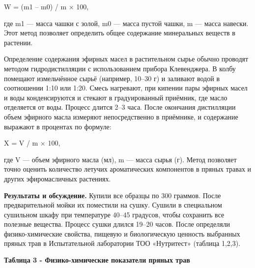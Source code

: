 \begin{multicols}{2}
W = (m1 -- m0) / m × 100,

где m1 --- масса чашки с золой, m0 --- масса пустой чашки, m --- масса
навески. Этот метод позволяет определить общее содержание минеральных
веществ в растении.

Определение содержания эфирных масел в растительном сырье обычно
проводят методом гидродистилляции с использованием прибора Клевенджера.
В колбу помещают измельчённое сырьё (например, 10--30 г) и заливают
водой в соотношении 1:10 или 1:20. Смесь нагревают, при кипении пары
эфирных масел и воды конденсируются и стекают в градуированный приёмник,
где масло отделяется от воды. Процесс длится 2--3 часа. После окончания
дистилляции объем эфирного масла измеряют непосредственно в приёмнике, и
содержание выражают в процентах по формуле:

X = V / m × 100,

где V --- объем эфирного масла (мл), m --- масса сырья (г). Метод
позволяет точно оценить количество летучих ароматических компонентов в
пряных травах и других эфиромасличных растениях.

{\bfseries Результаты и обсуждение.} Купили все образцы по 300 граммов.
После предварительной мойки их поместили на сушку. Сушили в специальном
сушильном шкафу при температуре 40--45 градусов, чтобы сохранить все
полезные вещества. Процесс сушки длился 19--20 часов. После определяли
физико-химические свойства, пищевую и биологическую ценность выбранных
пряных трав в Испытательной лаборатории ТОО «Нутритест» (таблица 1,2,3).
\end{multicols}

{\bfseries Таблица 3 - Физико-химические показатели пряных трав}

